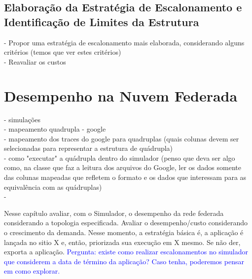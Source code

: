 \documentclass[tese,capa]{texufpel}
\begin{document}
\section{Elaboração da Estratégia de Escalonamento e Identificação de Limites da Estrutura}

- Propor uma estratégia de escalonamento mais elaborada, considerando alguns critérios (temos que ver estes critérios)\\
- Reavaliar os custos\\




\chapter{Desempenho na Nuvem Federada}

\noindent- simulações\\
- mapeamento quadrupla - google\\
- mapeamento dos traces do google para quadruplas (quais colunas devem ser selecionadas para representar a estrutura de quádrupla)\\
- como "executar" a quádrupla dentro do simulador (penso que deva ser algo como, na classe que faz a leitura dos arquivos do Google, ler os dados somente das colunas mapeadas que refletem o formato e os dados que interessam para as equivalência com as quádruplas)\\
- 

Nesse capítulo avaliar, com o Simulador, o desempenho da rede federada considerando a topologia especificada. Avaliar o desempenho/custo considerando o crescimento da demanda. Nesse momento, a estratégia básica é, a aplicação é lançada no sitio X e, então, priorizada sua execução em X mesmo. Se não der, exporta a aplicação. \textcolor{blue}{Pergunta: existe como realizar escalonamentos no simulador que considerem a data de término da aplicação? Caso tenha, poderemos pensar em como explorar.}
\end{document}
